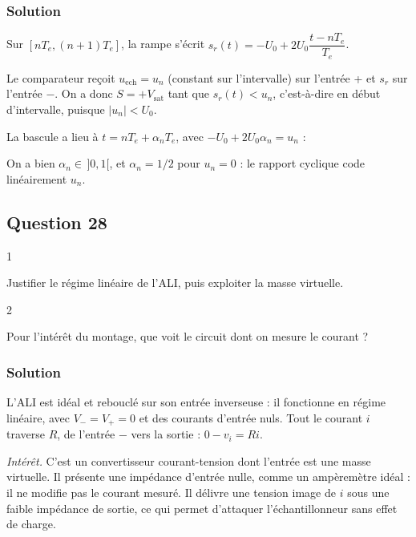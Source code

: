 \documentclass[11pt,a4paper]{article}
\newcommand{\equationajustee}[1]{%
  \sbox{\boiteequation}{$\displaystyle #1$}%
  \ifdim\wd\boiteequation>\linewidth
    \[\resizebox{\linewidth}{!}{\usebox{\boiteequation}}\]%
  \else
    \[#1\]%
  \fi}
\begin{document}
\hypertarget{solution-26}{%
\subsubsection{Solution}\label{solution-26}}

Sur \([nT_e,(n+1)T_e]\), la rampe s'écrit \(s_r(t)=-U_0+2U_0\dfrac{t-nT_e}{T_e}\).

Le comparateur reçoit \(u_{\text{ech}}=u_n\) (constant sur l'intervalle) sur l'entrée + et \(s_r\) sur l'entrée −. On a donc \(S=+V_{\text{sat}}\) tant que \(s_r(t)<u_n\), c'est-à-dire en début d'intervalle, puisque \(|u_n|<U_0\).

La bascule a lieu à \(t=nT_e+\alpha_nT_e\), avec \(-U_0+2U_0\alpha_n=u_n\) :

\equationajustee{\boxed{\alpha_n=\frac12\left(1+\frac{u_n}{U_0}\right)}}

On a bien \(\alpha_n\in\,]0,1[\), et \(\alpha_n=1/2\) pour \(u_n=0\) : le rapport cyclique code linéairement \(u_n\).

\hypertarget{question-28}{%
\subsection{Question 28}\label{question-28}}

\begin{indication}{1}

Justifier le régime linéaire de l'ALI, puis exploiter la masse virtuelle.

\end{indication}

\begin{indication}{2}

Pour l'intérêt du montage, que voit le circuit dont on mesure le courant ?

\end{indication}

\hypertarget{solution-27}{%
\subsubsection{Solution}\label{solution-27}}

L'ALI est idéal et rebouclé sur son entrée inverseuse : il fonctionne en régime linéaire, avec \(V_-=V_+=0\) et des courants d'entrée nuls. Tout le courant \(i\) traverse \(R\), de l'entrée − vers la sortie : \(0-v_i=Ri\).

\equationajustee{\boxed{v_i(t)=-R\,i(t)}}

\emph{Intérêt.} C'est un convertisseur courant-tension dont l'entrée est une masse virtuelle. Il présente une impédance d'entrée nulle, comme un ampèremètre idéal : il ne modifie pas le courant mesuré. Il délivre une tension image de \(i\) sous une faible impédance de sortie, ce qui permet d'attaquer l'échantillonneur sans effet de charge.
\end{document}
